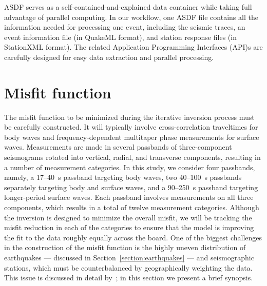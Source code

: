 \documentclass[extra,mreferee]{gji}
\begin{document}
ASDF serves as a self-contained-and-explained data container while taking
full advantage of parallel computing. In our workflow,
one ASDF file contains all the information needed for processing one event,
including the seismic traces, an event information file (in QuakeML format), and station response files (in StationXML format).
The related Application Programming Interfaces (API)s are carefully designed for easy data extraction and parallel processing.

\section{Misfit function}
\label{section:misfit}

The misfit function to be minimized during the iterative inversion process must
be carefully constructed. It will typically involve cross-correlation traveltimes
for body waves and frequency-dependent multitaper phase measurements for surface waves.
Measurements are made in several passbands of three-component seismograms rotated
into vertical, radial, and transverse components, resulting in a number of measurement
categories.
In this study, we consider four passbands, namely, a 17--40~s passband targeting body waves,
two 40--100~s passbands separately targeting body and surface waves,
and a 90--250~s passband targeting longer-period surface waves.
Each passband involves measurements on all three components,
which results in a total of twelve measurement categories.
Although the inversion is designed to minimize the overall misfit,
we will be tracking the misfit reduction in each of the categories to ensure that
the model is improving the fit to the data roughly equally across the board.
One of the biggest challenges in the construction of the misfit function is the
highly uneven distribution of earthquakes --- discussed in Section~\ref{section:earthquakes} --- and seismographic stations,
which must be counterbalanced by geographically weighting the data.
This issue is discussed in detail by~\cite{Ruanetal2018};
in this section we present a brief synopsis.
\end{document}
